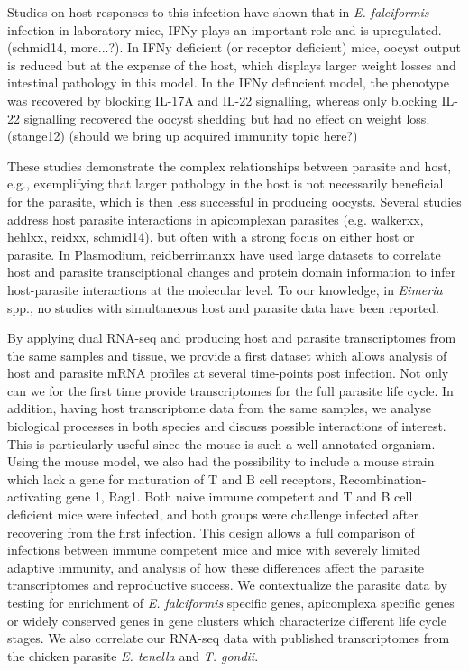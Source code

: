 \documentclass{bmcart}
\begin{document}
Studies on host responses to this infection have shown that in \textit{E. falciformis} infection in laboratory mice, IFNy plays an important role and is upregulated. (schmid14, more...?). In IFNy deficient (or receptor deficient) mice, oocyst output is reduced but at the expense of the host, which displays larger weight losses and intestinal pathology in this model. In the IFNy defincient model, the phenotype was recovered by blocking IL-17A and IL-22 signalling, whereas only blocking IL-22 signalling recovered the oocyst shedding but had no effect on weight loss. (stange12) (should we bring up acquired immunity topic here?)

These studies demonstrate the complex relationships between parasite and host, e.g., exemplifying that larger pathology in the host is not necessarily beneficial for the parasite, which is then less successful in producing oocysts. Several studies address host parasite interactions in apicomplexan parasites (e.g. walkerxx, hehlxx, reidxx, schmid14), but often with a strong focus on either host or parasite. In Plasmodium, reidberrimanxx have used large datasets to correlate host and parasite transciptional changes and protein domain information to infer host-parasite interactions at the molecular level. To our knowledge, in \textit{Eimeria} spp., no studies with simultaneous host and parasite data have been reported. 

By applying dual RNA-seq and producing host and parasite transcriptomes from the same samples and tissue, we provide a first dataset which allows analysis of host and parasite mRNA profiles at several time-points post infection. Not only can we for the first time provide transcriptomes for the full parasite life cycle. In addition, having host transcriptome data from the same samples, we analyse biological processes in both species and discuss possible interactions of interest. This is particularly useful since the mouse is such a well annotated organism. 
Using the mouse model, we also had the possibility to include a mouse strain which lack a gene for maturation of T and B cell receptors, Recombination-activating gene 1, Rag1. Both naive immune competent and T and B cell deficient mice were infected, and both groups were challenge infected after recovering from the first infection. This design allows a full comparison of infections between immune competent mice and mice with severely limited adaptive immunity, and analysis of how these differences affect the parasite transcriptomes and reproductive success. We contextualize the parasite data by testing for enrichment of \textit{E. falciformis} specific genes, apicomplexa specific genes or widely conserved genes in gene clusters which characterize different life cycle stages. We also correlate our RNA-seq data with published transcriptomes from the chicken parasite \textit{E. tenella} and \textit{T. gondii}. 
\end{document}
